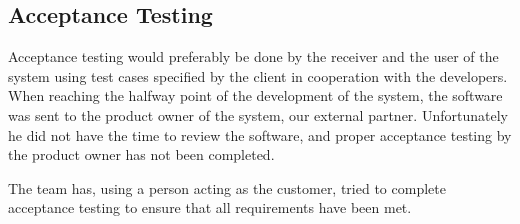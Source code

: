 \subsection{Acceptance Testing}
Acceptance testing would preferably be done by the receiver and the user of the system using test cases specified by the client in cooperation with the developers. When reaching the halfway point of the development of the system, the software was sent to the product owner of the system, our external partner. Unfortunately he did not have the time to review the software, and proper acceptance testing by the product owner has not been completed.

The team has, using a person acting as the customer, tried to complete acceptance testing to ensure that all requirements have been met. 